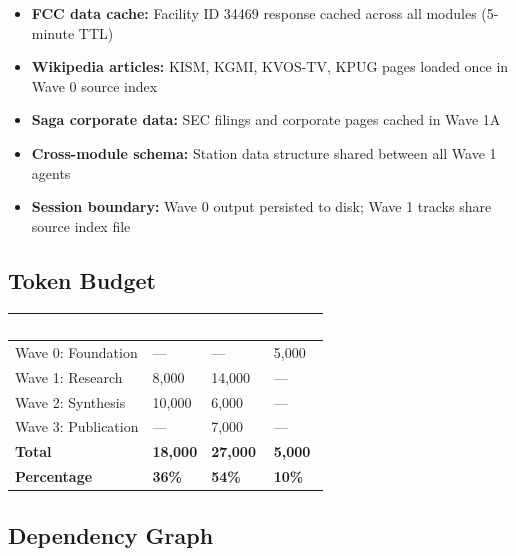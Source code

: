 \documentclass[11pt,letterpaper]{article}
\newcommand{\tableheader}[1]{\textbf{\sffamily\textcolor{white}{#1}}}
\begin{document}
\begin{itemize}[nosep]
\item \textbf{FCC data cache:} Facility ID 34469 response cached across all modules (5-minute TTL)
\item \textbf{Wikipedia articles:} KISM, KGMI, KVOS-TV, KPUG pages loaded once in Wave 0 source index
\item \textbf{Saga corporate data:} SEC filings and corporate pages cached in Wave 1A
\item \textbf{Cross-module schema:} Station data structure shared between all Wave 1 agents
\item \textbf{Session boundary:} Wave 0 output persisted to disk; Wave 1 tracks share source index file
\end{itemize}

\subsection{Token Budget}

\begin{center}
\begin{tabularx}{\textwidth}{L{4cm}C{2cm}C{2cm}C{2cm}}
\toprule
{}
\tableheader{Category} & \tableheader{Opus} & \tableheader{Sonnet} & \tableheader{Haiku} \\
\midrule
Wave 0: Foundation & --- & --- & 5,000 \\
Wave 1: Research & 8,000 & 14,000 & --- \\
Wave 2: Synthesis & 10,000 & 6,000 & --- \\
Wave 3: Publication & --- & 7,000 & --- \\
\midrule
\textbf{Total} & \textbf{18,000} & \textbf{27,000} & \textbf{5,000} \\
\textbf{Percentage} & \textbf{36\%} & \textbf{54\%} & \textbf{10\%} \\
\bottomrule
\end{tabularx}
\end{center}

\subsection{Dependency Graph}
\end{document}
